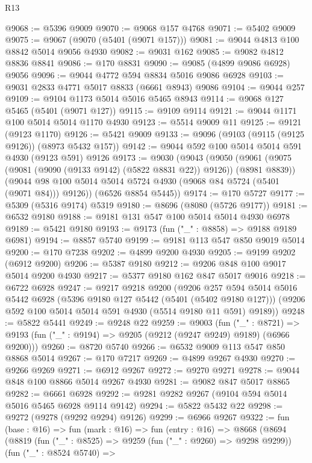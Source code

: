 \begin{lexlean}{R13}
\begin{coremodule}
@9068 := @5396 @9009
@9070 := @9068 @157 @4768
@9071 := @5402 @9009
@9075 := @9067 (@9070 (@5401 (@9071 @157)))
@9081 := @9044 @4813 @100 @8842 @5014 @9056 @4930
@9082 := @9031 @162
@9085 := @9082 @4812 @8836 @8841
@9086 := @170 @8831
@9090 := @9085 (@4899 @9086 @6928) @9056
@9096 := @9044 @4772 @594 @8834 @5016 @9086 @6928
@9103 := @9031 @2833 @4771 @5017 @8833 (@6661 @8943) @9086
@9104 := @9044 @257
@9109 := @9104 @1173 @5014 @5016 @5465 @8943
@9114 := @9068 @127 @5465 (@5401 (@9071 @127))
@9115 := @9109 @9114
@9121 := @9044 @1171 @100 @5014 @5014 @1170 @4930
@9123 := @5514 @9009 @11
@9125 := @9121 (@9123 @1170)
@9126 := @5421 @9009
@9133 := @9096 (@9103 (@9115 (@9125 @9126)) (@8973 @5432 @157))
@9142 := @9044 @592 @100 @5014 @5014 @591 @4930 (@9123 @591) @9126
@9173 := @9030
    (@9043
      (@9050
        (@9061 (@9075 (@9081 (@9090 (@9133 @9142) (@5822 @8831 @22)) @9126)) (@8981 @8839))
        (@9044 @98 @100 @5014 @5014 @5724 @4930 (@9068 @84 @5724 (@5401 (@9071 @84))) @9126))
      (@6526 @8854 @5445))
@9174 := @170 @5727
@9177 := @5309 (@5316 @9174) @5319
@9180 := @8696 (@8080 (@5726 @9177))
@9181 := @6532 @9180
@9188 := @9181 @131 @547 @100 @5014 @5014 @4930 @6978
@9189 := @5421 @9180
@9193 := @9173 (fun ("_" : @8858) => @9188 @9189 @6981)
@9194 := @8857 @5740
@9199 := @9181 @113 @547 @850 @9019 @5014
@9200 := @170 @7238
@9202 := @4899 @9200 @4930
@9205 := @9199 @9202 (@6912 @9200)
@9206 := @5387 @9180
@9212 := @9206 @848 @100 @9017 @5014 @9200 @4930
@9217 := @5377 @9180 @162 @847 @5017 @9016
@9218 := @6722 @6928
@9247 := @9217
    @9218
    @9200
    (@9206
      @257
      @594
      @5014
      @5016
      @5442
      @6928
      (@5396 @9180 @127 @5442 (@5401 (@5402 @9180 @127)))
      (@9206 @592 @100 @5014 @5014 @591 @4930 (@5514 @9180 @11 @591) @9189))
@9248 := @5822 @5441
@9249 := @9248 @22
@9259 := @9003
    (fun ("_" : @8721) =>
    @9193 (fun ("_" : @9194) => @9205 (@9212 (@9247 @9249) @9189) (@6966 @9200)))
@9260 := @8720 @5740
@9266 := @6532 @9009 @113 @547 @850 @8868 @5014
@9267 := @170 @7217
@9269 := @4899 @9267 @4930
@9270 := @9266 @9269
@9271 := @6912 @9267
@9272 := @9270 @9271
@9278 := @9044 @848 @100 @8866 @5014 @9267 @4930
@9281 := @9082 @847 @5017 @8865
@9282 := @6661 @6928
@9292 := @9281 @9282 @9267 (@9104 @594 @5014 @5016 @5465 @6928 @9114 @9142)
@9294 := @5822 @5432 @22
@9298 := @9272 (@9278 (@9292 @9294) @9126)
@9299 := @6966 @9267
@9322 := fun (base : @16) =>
  fun (mark : @16) =>
  fun (entry : @16) =>
  @8668
    (@8694
      (@8819
        (fun ("_" : @8525) => @9259 (fun ("_" : @9260) => @9298 @9299))
        (fun ("_" : @8524 @5740) =>

\end{coremodule}
\end{lexlean}
